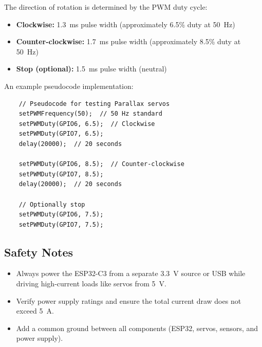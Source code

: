\documentclass[conference]{IEEEtran}
\begin{document}
The direction of rotation is determined by the PWM duty cycle:

\begin{itemize}
    \item \textbf{Clockwise:} 1.3~ms pulse width (approximately 6.5\% duty at 50~Hz)
    \item \textbf{Counter-clockwise:} 1.7~ms pulse width (approximately 8.5\% duty at 50~Hz)
    \item \textbf{Stop (optional):} 1.5~ms pulse width (neutral)
\end{itemize}

An example pseudocode implementation:

\begin{lstlisting}
    // Pseudocode for testing Parallax servos
    setPWMFrequency(50);  // 50 Hz standard
    setPWMDuty(GPIO6, 6.5);  // Clockwise
    setPWMDuty(GPIO7, 6.5);
    delay(20000);  // 20 seconds

    setPWMDuty(GPIO6, 8.5);  // Counter-clockwise
    setPWMDuty(GPIO7, 8.5);
    delay(20000);  // 20 seconds

    // Optionally stop
    setPWMDuty(GPIO6, 7.5);
    setPWMDuty(GPIO7, 7.5);
\end{lstlisting}

\subsection{Safety Notes}
\begin{itemize}
    \item Always power the ESP32-C3 from a separate 3.3~V source or USB while driving high-current loads like servos from 5~V.
    \item Verify power supply ratings and ensure the total current draw does not exceed 5~A.
    \item Add a common ground between all components (ESP32, servos, sensors, and power supply).
\end{itemize}
\end{document}
